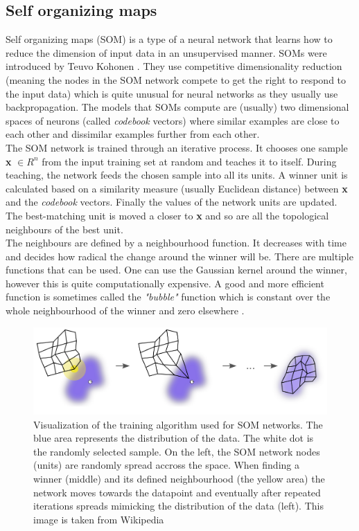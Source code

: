 \subsection{Self organizing maps}
Self organizing maps (SOM) is a type of a neural network that learns how to reduce the dimension of input data in an unsupervised manner. SOMs were introduced by Teuvo Kohonen \cite{Kohonen1982}. They use competitive dimensionality reduction (meaning the nodes in the SOM network compete to get the right to respond to the input data) which is quite unusual for neural networks as they usually use backpropagation. The models that SOMs compute are (usually) two dimensional spaces of neurons (called \textit{codebook} vectors) where similar examples are close to each other and dissimilar examples further from each other.\\
The SOM network is trained through an iterative process. It chooses one sample \textbf{x} \( \in R^n \) from the input training set at random and teaches it to itself. During teaching, the network feeds the chosen sample into all its units. A winner unit is calculated based on a similarity measure (usually Euclidean distance) between \textbf{x} and the \textit{codebook} vectors. Finally the values of the network units are updated. The best-matching unit is moved a closer to \textbf{x} and so are all the topological neighbours of the best unit.\\
The neighbours are defined by a neighbourhood function. It decreases with time and decides how radical the change around the winner will be. There are multiple functions that can be used. One can use the Gaussian kernel around the winner, however this is quite computationally expensive. A good and more efficient function is sometimes called the \textit{"bubble"} function which is constant over the whole neighbourhood of the winner and zero elsewhere \cite{SOM_training}.
\begin{figure}[H]
\begin{minipage}{\textwidth}
    \centering
	\includegraphics[width=140mm]{./img/Somtraining.png}
	\caption[]{Visualization of the training algorithm used for SOM networks. The blue area represents the distribution of the data. The white dot is the randomly selected sample. On the left, the SOM network nodes (units) are randomly spread accross the space. When finding a winner (middle) and its defined neighbourhood (the yellow area) the network moves towards the datapoint and eventually after repeated iterations spreads mimicking the distribution of the data (left). This image is taken from Wikipedia\footnotemark}
	\label{fig:som_training}
\end{minipage}
\end{figure}

